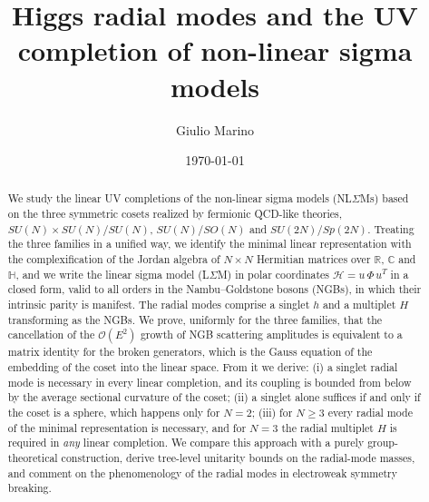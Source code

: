 \documentclass[aps,prd,twocolumn,superscriptaddress,nofootinbib,floatfix]{revtex4-2}
\theoremstyle{remark}
\newcommand{\Hf}{\mathcal{H}}      %
\begin{document}
\title{Higgs radial modes and the UV completion of non-linear sigma models}

\author{Giulio Marino}

\date{\today}

\begin{abstract}
We study the linear UV completions of the non-linear sigma models (NL$\Sigma$Ms) based on the three symmetric cosets realized by fermionic QCD-like theories, $SU(N)\times SU(N)/SU(N)$, $SU(N)/SO(N)$ and $SU(2N)/Sp(2N)$. Treating the three families in a unified way, we identify the minimal linear representation with the complexification of the Jordan algebra of $N\times N$ Hermitian matrices over $\mathbb{R}$, $\mathbb{C}$ and $\mathbb{H}$, and we write the linear sigma model (L$\Sigma$M) in polar coordinates $\Hf=u\,\Phi\, u^{T}$ in a closed form, valid to all orders in the Nambu--Goldstone bosons (NGBs), in which their intrinsic parity is manifest. The radial modes comprise a singlet $h$ and a multiplet $H$ transforming as the NGBs. We prove, uniformly for the three families, that the cancellation of the $\mathcal{O}(E^2)$ growth of NGB scattering amplitudes is equivalent to a matrix identity for the broken generators, which is the Gauss equation of the embedding of the coset into the linear space. From it we derive: (i) a singlet radial mode is necessary in every linear completion, and its coupling is bounded from below by the average sectional curvature of the coset; (ii) a singlet alone suffices if and only if the coset is a sphere, which happens only for $N=2$; (iii) for $N\ge3$ every radial mode of the minimal representation is necessary, and for $N=3$ the radial multiplet $H$ is required in \emph{any} linear completion. We compare this approach with a purely group-theoretical construction, derive tree-level unitarity bounds on the radial-mode masses, and comment on the phenomenology of the radial modes in electroweak symmetry breaking.
\end{abstract}

\maketitle
\end{document}
